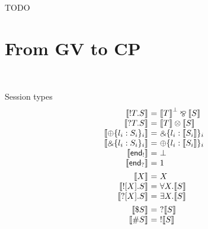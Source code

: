 \documentclass{easychair}
\makeatletter
\newcommand{\ba}{\begin{array}}
\newcommand{\ea}{\end{array}}
\newenvironment{equations}{\[\ba{@{}r@{~}c@{~}l@{}}}{\ea\]}
\newcommand{\key}{\mathsf}
\newcommand{\set}[1]{\{ #1 \}}
\newcommand{\gvtocp}[1]{\llbracket{#1}\rrbracket}
\newcommand{\row}[2]{\set{#1}_{#2}}
\newcommand{\gvOutput}[2]{!{#1}.{#2}}
\newcommand{\gvInput}[2]{?{#1}.{#2}}
\newcommand{\gvEndOutput}{\key{end}_!}
\newcommand{\gvEndInput}{\key{end}_?}
\newcommand{\gvPlus}[2]{\oplus \row{#1}{#2}}
\newcommand{\gvChoice}[2]{\binampersand \row{#1}{#2}}
\newcommand{\gvServer}[1]{\${#1}}
\newcommand{\gvService}[1]{\#{#1}}
\newcommand{\gvDual}[1]{\overline{#1}}
\newcommand{\gvOutputType}[2]{![{#1}].{#2}}
\newcommand{\gvInputType}[2]{?[{#1}].{#2}}
\newcommand{\gvj}[3]{{#1} \vdash {#2} : {#3}}
\newcommand{\la}{l}
\newcommand{\gvLink}[2]{\key{link}~{#1}~{#2}}
\newcommand{\gvSendType}[2]{\key{sendType}~{#1}~{#2}}
\newcommand{\gvReceiveType}[1]{\key{receiveType}~{#1}}
\newcommand{\gvServe}[3]{\key{serve}~{#1}({#2})={#3}}
\newcommand{\gvRequest}[1]{\key{request}~{#1}}
\newcommand{\cpTimes}[2]{{#1} \otimes {#2}}
\newcommand{\cpPar}[2]{{#1} \mathbin{\bindnasrepma} {#2}}
\newcommand{\cpPlus}[2]{\oplus \row{#1}{#2}}
\newcommand{\cpWith}[2]{\binampersand \row{#1}{#2}}
\newcommand{\cpOne}{1}
\newcommand{\cpBottom}{\bot}
\newcommand{\cpOfCourse}[1]{!{#1}}
\newcommand{\cpWhyNot}[1]{?{#1}}
\newcommand{\cpDual}[1]{{#1}^\bot}
\newcommand{\cpExists}[2]{\exists {#1}.{#2}}
\newcommand{\cpForall}[2]{\forall {#1}.{#2}}
\newcommand{\FV}[1]{\mathit{FV}(#1)}
\makeatother
\begin{document}
TODO

\cite{wadler2014jfp}

\label{sect:bib}

%
%
%










\newpage

\section{From GV to CP}
~

Session types
\begin{equations}
\gvtocp{\gvOutput{T}{S}}        &=& \cpPar{\cpDual{\gvtocp{T}}}{\gvtocp{S}} \\
\gvtocp{\gvInput{T}{S}}         &=& \cpTimes{\gvtocp{T}}{\gvtocp{S}} \\
\gvtocp{\gvPlus{\la_i:S_i}{i}}   &=& \cpWith{\la_i:\gvtocp{S_i}}{i} \\
\gvtocp{\gvChoice{\la_i:S_i}{i}} &=& \cpPlus{\la_i:\gvtocp{S_i}}{i} \\
\gvtocp{\gvEndOutput}              &=& \cpBottom \\
\gvtocp{\gvEndInput}               &=& \cpOne \\[1ex]

\gvtocp{X}                       &=& X \\
\gvtocp{\gvOutputType{X}{S}}     &=& \cpForall{X}{\gvtocp{S}} \\
\gvtocp{\gvInputType{X}{S}}      &=& \cpExists{X}{\gvtocp{S}} \\[1ex]

\gvtocp{\gvServer{S}}  &=& \cpWhyNot{\gvtocp{S}} \\
\gvtocp{\gvService{S}} &=& \cpOfCourse{\gvtocp{S}} \\[1ex]
\end{equations}
\end{document}
